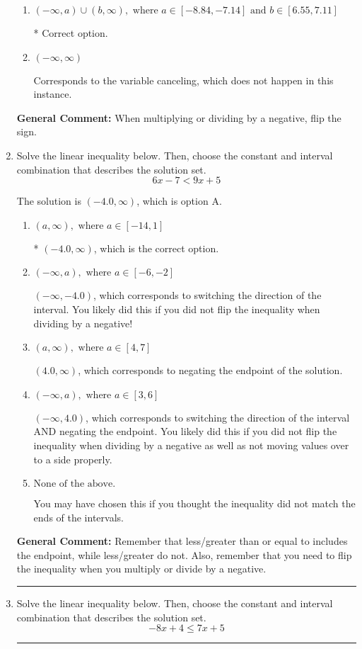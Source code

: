 \documentclass{extbook}[14pt]
\newcommand{\litem}[1]{\item #1

\rule{\textwidth}{0.4pt}}
\begin{document}
\begin{enumerate}
{\begin{enumerate}[label=\Alph*.]
Corresponds to including the endpoints AND negating.
\item \( (-\infty, a) \cup (b, \infty), \text{ where } a \in [-8.84, -7.14] \text{ and } b \in [6.55, 7.11] \)

 * Correct option.
\item \( (-\infty, \infty) \)

Corresponds to the variable canceling, which does not happen in this instance.
\end{enumerate}

\textbf{General Comment:} When multiplying or dividing by a negative, flip the sign.
}
\litem{
Solve the linear inequality below. Then, choose the constant and interval combination that describes the solution set.
\[ 6x -7 < 9x + 5 \]

The solution is \( (-4.0, \infty) \), which is option A.\begin{enumerate}[label=\Alph*.]
\item \( (a, \infty), \text{ where } a \in [-14, 1] \)

* $(-4.0, \infty)$, which is the correct option.
\item \( (-\infty, a), \text{ where } a \in [-6, -2] \)

 $(-\infty, -4.0)$, which corresponds to switching the direction of the interval. You likely did this if you did not flip the inequality when dividing by a negative!
\item \( (a, \infty), \text{ where } a \in [4, 7] \)

 $(4.0, \infty)$, which corresponds to negating the endpoint of the solution.
\item \( (-\infty, a), \text{ where } a \in [3, 6] \)

 $(-\infty, 4.0)$, which corresponds to switching the direction of the interval AND negating the endpoint. You likely did this if you did not flip the inequality when dividing by a negative as well as not moving values over to a side properly.
\item \( \text{None of the above}. \)

You may have chosen this if you thought the inequality did not match the ends of the intervals.
\end{enumerate}

\textbf{General Comment:} Remember that less/greater than or equal to includes the endpoint, while less/greater do not. Also, remember that you need to flip the inequality when you multiply or divide by a negative.
}
\litem{
Solve the linear inequality below. Then, choose the constant and interval combination that describes the solution set.
\[ -8x + 4 \leq 7x + 5 \]

}
\end{enumerate}
\end{document}
